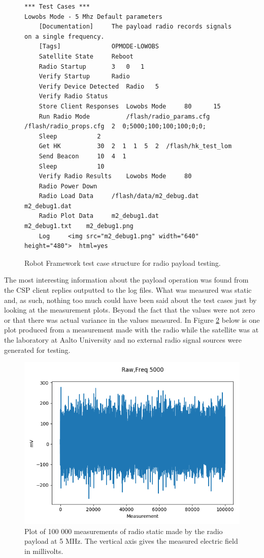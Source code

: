 \documentclass[english,12pt,a4paper,pdftex,elec,utf8]{aaltothesis}
\begin{document}
\begin{figure}[h!]
\centering
\begin{verbatim}
*** Test Cases ***
Lowobs Mode - 5 Mhz Default parameters
	[Documentation]		The payload radio records signals on a single frequency.
	[Tags]				OPMODE-LOWOBS
	Satellite State		Reboot
	Radio Startup		3	0	1
	Verify Startup		Radio
	Verify Device Detected	Radio 	5
	Verify Radio Status
	Store Client Responses	Lowobs Mode		80		15
	Run Radio Mode			/flash/radio_params.cfg  /flash/radio_props.cfg  2  0;5000;100;100;100;0;0;
	Sleep			2
	Get HK			30  2  1  1  5  2  /flash/hk_test_lom
	Send Beacon		10  4  1
	Sleep			10
	Verify Radio Results	Lowobs Mode		80
	Radio Power Down
	Radio Load Data 	/flash/data/m2_debug.dat 	m2_debug1.dat
	Radio Plot Data 	m2_debug1.dat 				m2_debug1.txt	 m2_debug1.png
	Log		<img src="m2_debug1.png" width="640" height="480">	html=yes
\end{verbatim}
\caption{Robot Framework test case structure for radio payload testing.}
\label{robotradio}
\end{figure}
The most interesting information about the payload operation was found from the CSP client replies outputted to the log files. What was measured was static and, as such, nothing too much could have been said about the test cases just by looking at the measurement plots. Beyond the fact that the values were not zero or that there was actual variance in the values measured. In Figure \ref{m1_debug1joo} below is one plot produced from a measurement made with the radio while the satellite was at the laboratory at Aalto University and no external radio signal sources were generated for testing.\par 
\begin{figure}[h!]
\centering
\includegraphics[scale=0.6]{m1_debug1}
\caption{Plot of 100 000 measurements of radio static made by the radio payload at 5 MHz. The vertical axis gives the measured electric field in millivolts.}
\label{m1_debug1joo}
\end{figure}
\end{document}

